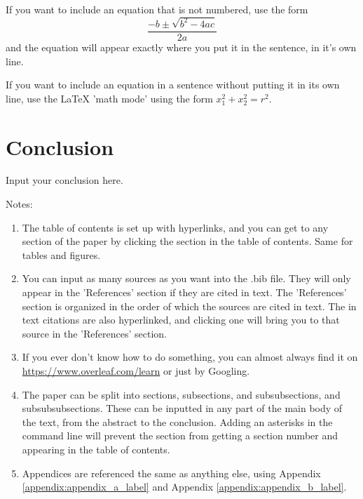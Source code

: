 \documentclass{article}
\newcounter{subsubsubsection}[subsubsection]
\begin{document}
\begin{doublespacing}
\par If you want to include an equation that is not numbered, use the form $$\frac{-b\pm \sqrt{b^{2}-4ac}}{2a}$$ and the equation will appear exactly where you put it in the sentence, in it's own line. 

\par If you want to include an equation in a sentence without putting it in its own line, use the LaTeX 'math mode' using the form $x_{1}^{2}+x_{2}^{2}=r^{2}$. 


\section{Conclusion}

\noindent Input your conclusion here. 

\par Notes: 
\begin{enumerate}
    \item The table of contents is set up with hyperlinks, and you can get to any section of the paper by clicking the section in the table of contents. Same for tables and figures. 
    \item You can input as many sources as you want into the .bib file. They will only appear in the 'References' section if they are cited in text. The 'References' section is organized in the order of which the sources are cited in text. The in text citations are also hyperlinked, and clicking one will bring you to that source in the 'References' section. 
    \item If you ever don't know how to do something, you can almost always find it on \url{https://www.overleaf.com/learn} or just by Googling. 
    \item The paper can be split into sections, subsections, and subsubsections, and subsubsubsections. These can be inputted in any part of the main body of the text, from the abstract to the conclusion. Adding an asterisks in the command line will prevent the section from getting a section number and appearing in the table of contents.
    \item Appendices are referenced the same as anything else, using Appendix \ref{appendix:appendix_a_label} and Appendix \ref{appendix:appendix_b_label}.
\end{enumerate}

\newpage %
\begin{appendices}


\end{appendices}
\end{doublespacing}
\end{document}
